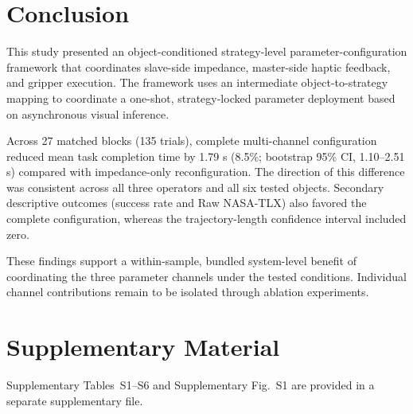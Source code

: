 \section{Conclusion}
This study presented an object-conditioned strategy-level parameter-configuration framework that coordinates slave-side impedance, master-side haptic feedback, and gripper execution. The framework uses an intermediate object-to-strategy mapping to coordinate a one-shot, strategy-locked parameter deployment based on asynchronous visual inference.

Across 27 matched blocks (135 trials), complete multi-channel configuration reduced mean task completion time by 1.79 s (8.5\%; bootstrap 95\% CI, 1.10--2.51 s) compared with impedance-only reconfiguration. The direction of this difference was consistent across all three operators and all six tested objects. Secondary descriptive outcomes (success rate and Raw NASA-TLX) also favored the complete configuration, whereas the trajectory-length confidence interval included zero.

These findings support a within-sample, bundled system-level benefit of coordinating the three parameter channels under the tested conditions. Individual channel contributions remain to be isolated through ablation experiments.

\section*{Supplementary Material}
Supplementary Tables~S1--S6 and Supplementary Fig.~S1 are provided in a separate supplementary file.
